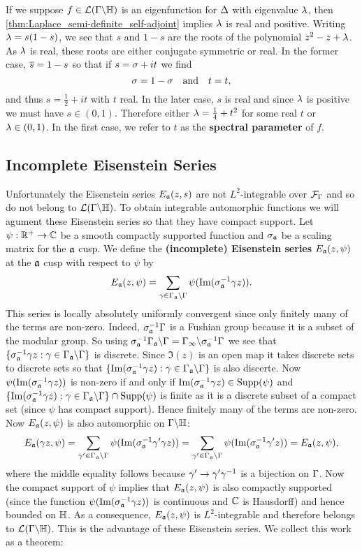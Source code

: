       If we suppose $f \in \mathcal{L}(\Gamma\backslash\mathbb{H})$ is an eigenfunction for $\Delta$ with eigenvalue $\lambda$, then \cref{thm:Laplace_semi-definite_self-adjoint} implies $\lambda$ is real and positive. Writing $\lambda = s(1-s)$, we see that $s$ and $1-s$ are the roots of the polynomial $z^{2}-z+\lambda$. As $\lambda$ is real, these roots are either conjugate symmetric or real. In the former case, $\overline{s} = 1-s$ so that if $s = \sigma+it$ we find
      \[
        \sigma = 1-\sigma \quad \text{and} \quad t = t,
      \]
      and thus $s = \frac{1}{2}+it$ with $t$ real. In the later case, $s$ is real and since $\lambda$ is positive we must have $s \in (0,1)$. Therefore either $\lambda = \frac{1}{4}+t^{2}$ for some real $t$ or $\lambda \in (0,1)$. In the first case, we refer to $t$ as the \textbf{spectral parameter} of $f$.
    \subsection*{Incomplete Eisenstein Series}
      Unfortunately the Eisenstein series $E_{\mathfrak{a}}(z,s)$ are not $L^{2}$-integrable over $\mathcal{F}_{\Gamma}$ and so do not belong to $\mathcal{L}(\Gamma\backslash\mathbb{H})$. To obtain integrable automorphic functions we will agument these Eisenstein series so that they have compact support. Let $\psi:\mathbb{R}^{+} \to \mathbb{C}$ be a smooth compactly supported function and $\sigma_{\mathfrak{a}}$ be a scaling matrix for the $\mathfrak{a}$ cusp. We define the \textbf{(incomplete) Eisenstein series} $E_{\mathfrak{a}}(z,\psi)$ at the $\mathfrak{a}$ cusp with respect to $\psi$ by
      \[
        E_{\mathfrak{a}}(z,\psi) = \sum_{\gamma \in \Gamma_{\mathfrak{a}}\backslash\Gamma}\psi(\mathrm{Im}(\sigma_{\mathfrak{a}}^{-1}\gamma z)).
      \]
      This series is locally absolutely uniformly convergent since only finitely many of the terms are non-zero. Indeed, $\sigma_{\mathfrak{a}}^{-1}\Gamma$ is a Fushian group because it is a subset of the modular group. So using $\sigma_{\mathfrak{a}}^{-1}\Gamma_{\mathfrak{a}}\backslash\Gamma = \Gamma_{\infty}\backslash\sigma_{\mathfrak{a}}^{-1}\Gamma$ we see that $\{\sigma_{\mathfrak{a}}^{-1}\gamma z:\gamma \in \Gamma_{\mathfrak{a}}\backslash\Gamma\}$ is discrete. Since $\Im(z)$ is an open map it takes discrete sets to discrete sets so that $\{\mathrm{Im}(\sigma_{\mathfrak{a}}^{-1}\gamma z):\gamma \in \Gamma_{\mathfrak{a}}\backslash\Gamma\}$ is also discerte. Now $\psi(\mathrm{Im}(\sigma_{\mathfrak{a}}^{-1}\gamma z))$ is non-zero if and only if $\mathrm{Im}(\sigma_{\mathfrak{a}}^{-1}\gamma z) \in \mathrm{Supp}(\psi)$ and $\{\mathrm{Im}(\sigma_{\mathfrak{a}}^{-1}\gamma z):\gamma \in \Gamma_{\mathfrak{a}}\backslash\Gamma\} \cap \mathrm{Supp}(\psi)$ is finite as it is a discrete subset of a compact set (since $\psi$ has compact support). Hence finitely many of the terms are non-zero. Now $E_{\mathfrak{a}}(z,\psi)$ is also automorphic on $\Gamma\backslash\mathbb{H}$:
      \[
        E_{\mathfrak{a}}(\gamma z,\psi) = \sum_{\gamma' \in \Gamma_{\mathfrak{a}}\backslash\Gamma}\psi(\mathrm{Im}(\sigma_{\mathfrak{a}}^{-1}\gamma'\gamma z)) = \sum_{\gamma' \in \Gamma_{\mathfrak{a}}\backslash\Gamma}\psi(\mathrm{Im}(\sigma_{\mathfrak{a}}^{-1}\gamma' z)) = E_{\mathfrak{a}}(z,\psi),
      \]
      where the middle equality follows because $\gamma' \to \gamma'\gamma^{-1}$ is a bijection on $\Gamma$. Now the compact support of $\psi$ implies that $E_{\mathfrak{a}}(z,\psi)$ is also compactly supported (since the function $\psi(\mathrm{Im}(\sigma_{\mathfrak{a}}^{-1}\gamma z))$ is continuous and $\mathbb{C}$ is Hausdorff) and hence bounded on $\mathbb{H}$. As a consequence, $E_{\mathfrak{a}}(z,\psi)$ is $L^{2}$-integrable and therefore belongs to $\mathcal{L}(\Gamma\backslash\mathbb{H})$. This is the advantage of these Eisenstein series. We collect this work as a theorem:

